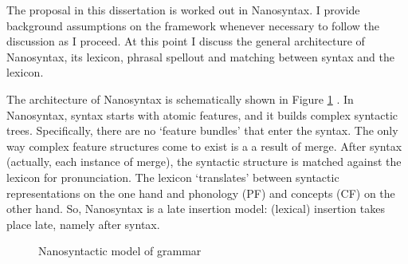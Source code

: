 


The proposal in this dissertation is worked out in Nanosyntax. I provide background assumptions on the framework whenever necessary to follow the discussion as I proceed. At this point I discuss the general architecture of Nanosyntax, its lexicon, phrasal spellout and matching between syntax and the lexicon.

The architecture of Nanosyntax is schematically shown in Figure \ref{fig:nano} \citep[from][]{vandenwyngaerd2020,caha2019}. In Nanosyntax, syntax starts with atomic features, and it builds complex syntactic trees. Specifically, there are no `feature bundles' that enter the syntax. The only way complex feature structures come to exist is a a result of merge.
After syntax (actually, each instance of merge), the syntactic structure is matched against the lexicon for pronunciation. The lexicon `translates' between syntactic representations on the one hand and phonology (PF) and concepts (CF) on the other hand. So, Nanosyntax is a late insertion model: (lexical) insertion takes place late, namely after syntax.

\begin{figure}[ht]
  \centering
  \caption{Nanosyntactic model of grammar}
  \label{fig:nano}
\end{figure}

